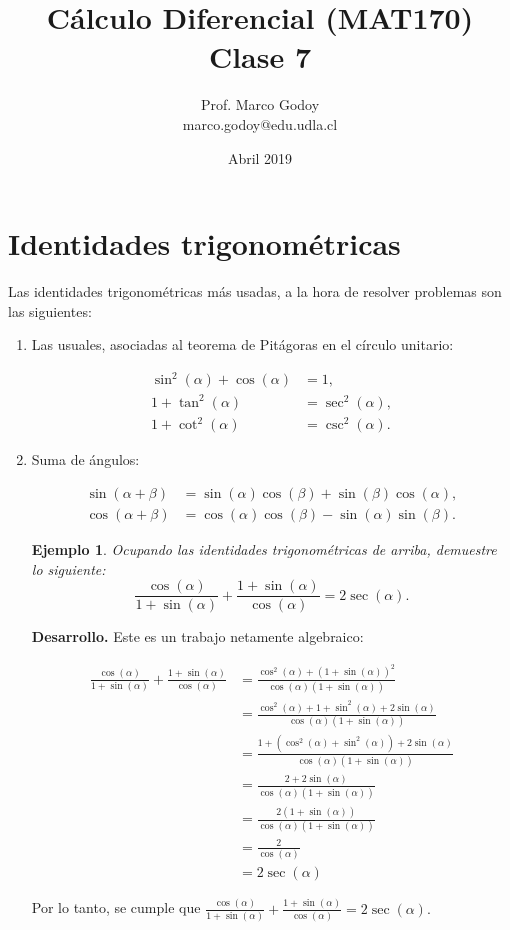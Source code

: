 \documentclass[10pt]{article}
\title{C\'alculo Diferencial (MAT170)\\ Clase 7 }
\author{Prof. Marco Godoy\\
marco.godoy@edu.udla.cl}
\date{Abril 2019}
\newcommand{\2}[1]{\hspace{-0.93cm}\colorbox{color1}{\hspace{0.07cm} \parbox{17cm}{\vspace{0.2cm} #1}\hspace*{0.07cm} }}
\newcommand{\3}[1]{\hspace{-0.93cm}\colorbox{color7}{\hspace{0.07cm} \parbox{17cm}{\vspace{0.2cm} #1}\hspace*{0.07cm} }}
\theoremstyle{theorem}
\newtheorem{eje}{Ejemplo}%
\numberwithin{equation}{section}
\newcommand{\dis}{\displaystyle}
\begin{document}
\maketitle

\section{Identidades trigonom\'etricas}

Las identidades trigonom\'etricas m\'as usadas, a la hora de resolver problemas son las siguientes:

\begin{enumerate}[1.]

\item Las usuales, asociadas al teorema de Pit\'agoras en el c\'irculo unitario:

\begin{align*}
  \sin^2(\alpha)+\cos(\alpha)&=1,\\
  1+\tan^2(\alpha)&=\sec^2(\alpha),\\
  1+\cot^2(\alpha)&=\csc^2(\alpha).
\end{align*}

\item Suma de \'angulos:

\begin{align*}
\sin(\alpha+\beta)&=\sin(\alpha)\cos(\beta)+\sin(\beta)\cos(\alpha),\\
\cos(\alpha+\beta)&=\cos(\alpha)\cos(\beta)-\sin(\alpha)\sin(\beta).
\end{align*}

\begin{eje}
Ocupando las identidades trigonom\'etricas de arriba, demuestre lo siguiente: $$\frac{\cos(\alpha)}{1+\sin(\alpha)}+\frac{1+\sin(\alpha)}{\cos(\alpha)}=2\sec(\alpha).$$

\end{eje}

\textbf{Desarrollo.} Este es un trabajo netamente algebraico:

\begin{align*}
\frac{\cos(\alpha)}{1+\sin(\alpha)}+\frac{1+\sin(\alpha)}{\cos(\alpha)}&=\frac{\cos^2(\alpha)+(1+\sin(\alpha))^2}{\cos(\alpha )(1+\sin(\alpha))}\\
&=\frac{\cos^2(\alpha)+1+\sin^2(\alpha)+2\sin(\alpha)}{\cos(\alpha )(1+\sin(\alpha))}\\
&=\frac{1+(\cos^2(\alpha)+\sin^2(\alpha))+2\sin(\alpha)}{\cos(\alpha )(1+\sin(\alpha))}\\
&=\frac{2+2\sin(\alpha)}{\cos(\alpha )(1+\sin(\alpha))}\\
&=\frac{2(1+\sin(\alpha))}{\cos(\alpha )(1+\sin(\alpha))}\\
&=\frac{2}{\cos(\alpha )}\\
&=2\sec(\alpha)
\end{align*}

Por lo tanto, se cumple que $\dis \frac{\cos(\alpha)}{1+\sin(\alpha)}+\frac{1+\sin(\alpha)}{\cos(\alpha)}=2\sec(\alpha).$

\end{enumerate}
\end{document}
